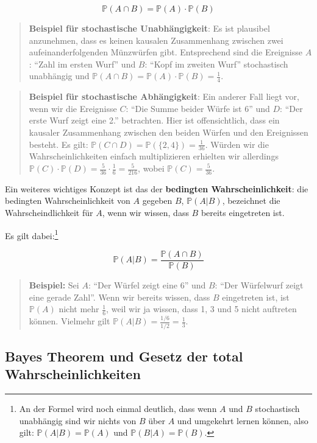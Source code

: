 \documentclass[]{book}
\let\rmarkdownfootnote\footnote%
\def\footnote{\protect\rmarkdownfootnote}
\begin{document}
\[\mathbb{P}(A\cap B) = \mathbb{P}(A)\cdot\mathbb{P}(B)\]

\begin{quote}
\textbf{Beispiel für stochastische Unabhängigkeit}: Es ist plausibel
anzunehmen, dass es keinen kausalen Zusammenhang zwischen zwei
aufeinanderfolgenden Münzwürfen gibt. Entsprechend sind die Ereignisse
\(A\): ``Zahl im ersten Wurf'' und \(B\): ``Kopf im zweiten Wurf''
stochastisch unabhängig und
\(\mathbb{P}(A\cap B)=\mathbb{P}(A)\cdot \mathbb{P}(B)=\frac{1}{4}\).
\end{quote}

\begin{quote}
\textbf{Beispiel für stochastische Abhängigkeit}: Ein anderer Fall liegt
vor, wenn wir die Ereignisse \(C\): ``Die Summe beider Würfe ist 6'' und
\(D\): ``Der erste Wurf zeigt eine 2.'' betrachten. Hier ist
offensichtlich, dass ein kausaler Zusammenhang zwischen den beiden
Würfen und den Ereignissen besteht. Es gilt:
\(\mathbb{P}(C\cap D)=\mathbb{P}(\{2, 4\})=\frac{1}{36}\). Würden wir
die Wahrscheinlichkeiten einfach multiplizieren erhielten wir allerdings
\(\mathbb{P}(C)\cdot \mathbb{P}(D)=\frac{5}{36}\cdot\frac{1}{6}=\frac{5}{216}\),
wobei \(\mathbb{P}(C)=\frac{5}{36}\).
\end{quote}

Ein weiteres wichtiges Konzept ist das der \textbf{bedingten
Wahrscheinlichkeit}: die bedingten Wahrscheinlichkeit von \(A\) gegeben
\(B\), \(\mathbb{P}(A|B)\), bezeichnet die Wahrscheindlichkeit für
\(A\), wenn wir wissen, dass \(B\) bereits eingetreten ist.

Es gilt dabei:\footnote{An der Formel wird noch einmal deutlich, dass
  wenn \(A\) und \(B\) stochastisch unabhängig sind wir nichts von \(B\)
  über \(A\) und umgekehrt lernen können, also gilt:
  \(\mathbb{P}(A|B)=\mathbb{P}(A)\) und
  \(\mathbb{P}(B|A)=\mathbb{P}(B)\).}

\[\mathbb{P}(A|B)=\frac{\mathbb{P}(A\cap B)}{\mathbb{P}(B)}\]

\begin{quote}
\textbf{Beispiel:} Sei \(A\): ``Der Würfel zeigt eine 6'' und \(B\):
``Der Würfelwurf zeigt eine gerade Zahl''. Wenn wir bereits wissen, dass
\(B\) eingetreten ist, ist \(\mathbb{P}(A)\) nicht mehr \(\frac{1}{6}\),
weil wir ja wissen, dass 1, 3 und 5 nicht auftreten können. Vielmehr
gilt \(\mathbb{P}(A|B)=\frac{1/6}{1/2}=\frac{1}{3}\).
\end{quote}

\subsection{Bayes Theorem und Gesetz der total
Wahrscheinlichkeiten}\label{bayes-theorem-und-gesetz-der-total-wahrscheinlichkeiten}
\end{document}
